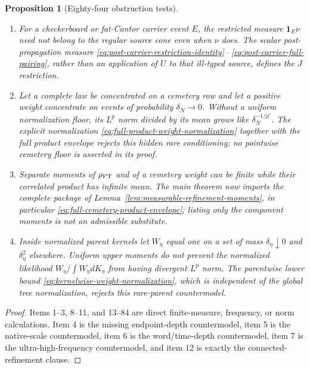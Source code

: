 \documentclass[11pt]{article}
\newtheorem{proposition}[theorem]{Proposition}
\newcommand{\one}{\mathbf 1}
\begin{document}
\begin{proposition}[Eighty-four obstruction tests]
\begin{enumerate}[label=\textup{(T\arabic*)}]
      independently declared stronger marginal norm diverges on its projected
      marginals.  The concrete choice
      $\mathfrak R_R=\mathcal M(M)$, the contractive identities
      \eqref{eq:bounded-face-marginal-maps}, and the separate weak
      $\mathfrak R_{\rm BL}$ convergence close the product-current type
      without importing such an uncharged strong norm or demanding TV
      convergence of a moving collar.
\item For a checkerboard or fat-Cantor carrier event $E$, the restricted
      measure $\one_E\nu$ need not belong to the regular source cone even
      when $\nu$ does.  The scalar post-propagation measure
      \eqref{eq:post-carrier-restriction-identity}--
      \eqref{eq:post-carrier-full-pairing}, rather than an application of
      $U$ to that ill-typed source, defines the $J$ restriction.
\item Let a complete law be concentrated on a cemetery row and let a
      positive weight concentrate on events of probability $\delta_N\to0$.
      Without a uniform normalization floor, its $L^p$ norm divided by its
      mean grows like $\delta_N^{-1/p'}$.  The explicit normalization
      \eqref{eq:full-product-weight-normalization} together with the full
      product envelope rejects this hidden rare conditioning; no pointwise
      cemetery floor is asserted in its proof.
\item Separate moments of $\rho_{\rm PT}$ and of a cemetery weight can be
      finite while their correlated product has infinite mean.  The main
      theorem now imports the complete package of
      Lemma~\ref{lem:measurable-refinement-moments}, in particular
      \eqref{eq:full-cemetery-product-envelope}; listing only the component
      moments is not an admissible substitute.
\item Inside normalized parent kernels let $W_\eta$ equal one on a set of
      mass $\delta_\eta\downarrow0$ and $\delta_\eta^2$ elsewhere.  Uniform
      upper moments do not prevent the normalized likelihood
      $W_\eta/\int W_\eta dK_\eta$ from having divergent $L^p$ norm.  The
      parentwise lower bound
      \eqref{eq:kernelwise-weight-normalization}, which is independent of the
      global tree normalization, rejects this rare-parent countermodel.
\end{enumerate}
\end{proposition}

\begin{proof}
Items 1--3, 8--11, and 13--84 are direct finite-measure, frequency, or norm
calculations.  Item 4 is the missing endpoint-depth countermodel, item 5 is
the native-scale countermodel, item 6 is the word/time-depth countermodel,
item 7 is the ultra-high-frequency countermodel, and item 12 is exactly the
connected-refinement clause.
\end{proof}
\end{document}
